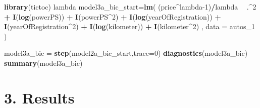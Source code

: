 \documentclass[]{article}
\newenvironment{Shaded}{\begin{snugshade}}{\end{snugshade}}
\newcommand{\DataTypeTok}[1]{\textcolor[rgb]{0.13,0.29,0.53}{#1}}
\newcommand{\DecValTok}[1]{\textcolor[rgb]{0.00,0.00,0.81}{#1}}
\newcommand{\KeywordTok}[1]{\textcolor[rgb]{0.13,0.29,0.53}{\textbf{#1}}}
\newcommand{\NormalTok}[1]{#1}
\newcommand{\OperatorTok}[1]{\textcolor[rgb]{0.81,0.36,0.00}{\textbf{#1}}}
\newcommand{\StringTok}[1]{\textcolor[rgb]{0.31,0.60,0.02}{#1}}
\begin{document}
\begin{Shaded}
\begin{Highlighting}[]
\KeywordTok{library}\NormalTok{(tictoc)}
\NormalTok{lambda}
\NormalTok{model3a_bic_start=}\KeywordTok{lm}\NormalTok{( (price}\OperatorTok{^}\NormalTok{lambda}\DecValTok{-1}\NormalTok{)}\OperatorTok{/}\NormalTok{lambda }\OperatorTok{~}\StringTok{ }\NormalTok{.}\OperatorTok{^}\DecValTok{2}
                      \OperatorTok{+}\StringTok{ }\KeywordTok{I}\NormalTok{(}\KeywordTok{log}\NormalTok{(powerPS)) }\OperatorTok{+}\StringTok{ }\KeywordTok{I}\NormalTok{(powerPS}\OperatorTok{^}\DecValTok{2}\NormalTok{)}
                      \OperatorTok{+}\StringTok{ }\KeywordTok{I}\NormalTok{(}\KeywordTok{log}\NormalTok{(yearOfRegistration)) }\OperatorTok{+}\StringTok{ }\KeywordTok{I}\NormalTok{(yearOfRegistration}\OperatorTok{^}\DecValTok{2}\NormalTok{) }
                      \OperatorTok{+}\StringTok{ }\KeywordTok{I}\NormalTok{(}\KeywordTok{log}\NormalTok{(kilometer)) }\OperatorTok{+}\StringTok{ }\KeywordTok{I}\NormalTok{(kilometer}\OperatorTok{^}\DecValTok{2}\NormalTok{)}
\NormalTok{                      , }\DataTypeTok{data =}\NormalTok{ autos_}\DecValTok{1}\NormalTok{ )}

\NormalTok{model3a_bic =}\StringTok{ }\KeywordTok{step}\NormalTok{(model2a_bic_start,}\DataTypeTok{trace=}\DecValTok{0}\NormalTok{)}
\KeywordTok{diagnostics}\NormalTok{(model3a_bic)}
\KeywordTok{summary}\NormalTok{(model3a_bic)}
\end{Highlighting}
\end{Shaded}

\hypertarget{results}{%
\section{3. Results}\label{results}}
\end{document}
